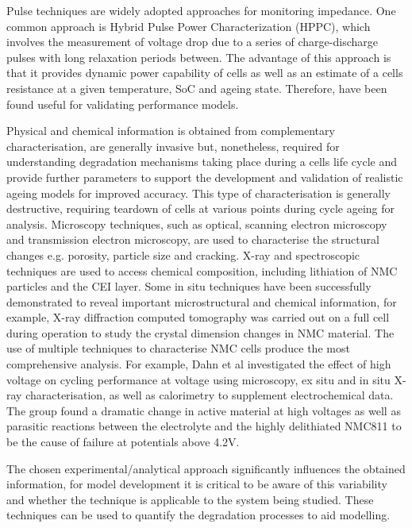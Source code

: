 \documentclass[journal=jacsat,manuscript=article]{achemso}
\begin{document}
Pulse techniques are widely adopted approaches for monitoring impedance. One common approach is Hybrid Pulse Power Characterization (HPPC), which involves the measurement of voltage drop due to a series of charge-discharge pulses with long relaxation periods between. The advantage of this approach is that it provides dynamic power capability of cells as well as an estimate of a cells resistance at a given temperature, SoC and ageing state.\cite{Barai2019} Therefore, have been found useful for validating performance models.\cite{Andre2011}

Physical and chemical information is obtained from complementary characterisation, are generally invasive but, nonetheless, required for  understanding degradation mechanisms taking place during a cells life cycle and provide further parameters to support the development and validation of realistic ageing models for improved accuracy. This type of characterisation is generally destructive, requiring teardown of cells at various points during cycle ageing for analysis. Microscopy techniques, such as optical, scanning electron microscopy and transmission electron microscopy, are used to characterise the structural changes e.g. porosity, particle size and cracking. X-ray and spectroscopic techniques are used to access chemical composition, including lithiation of NMC particles and the CEI layer.\cite{Waldmann2016} Some in situ techniques have been successfully demonstrated to reveal important microstructural and chemical information, for example, X-ray diffraction computed tomography was carried out on a full cell during operation to study the crystal dimension changes in NMC material.\cite{Sohrab2020} The use of multiple techniques to characterise NMC cells produce the most comprehensive analysis. For example, Dahn et al investigated the effect of high voltage on cycling performance at voltage using microscopy, ex situ and in situ X-ray characterisation, as well as calorimetry to supplement electrochemical data. The group found a dramatic change in active material at high voltages as well as parasitic reactions between the electrolyte and the highly delithiated NMC811 to be the cause of failure at potentials above 4.2V.\cite{Li2015} 

The chosen experimental/analytical approach significantly influences the obtained information, for model development it is critical to be aware of this variability and whether the technique is applicable to the system being studied. These techniques can be used to quantify the degradation processes to aid modelling.
\end{document}

